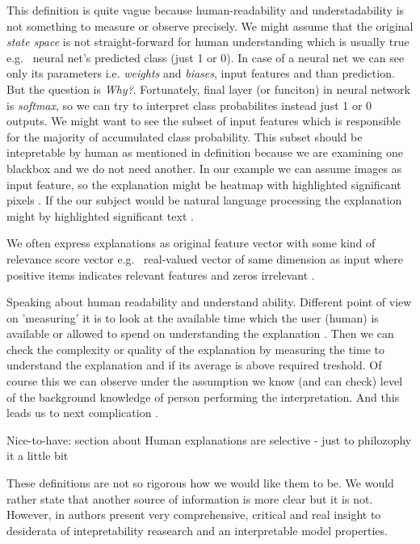 This definition is quite vague because human-readability and understadability is not something to measure or observe precisely. We might assume that the original \emph{state space} is not straight-forward for human understanding which is usually true e.g. \ neural net's predicted class (just 1 or 0). In case of a neural net we can see only its parameters i.e. \emph{weights} and \emph{biases}, input features and than prediction. But the question is \emph{Why?}. Fortunately, final layer (or funciton) in neural network is \emph{softmax}, so we can try to interpret class probabilites instead just 1 or 0 outputs. We might want to see the subset of input features which is responsible for the majority of accumulated class probability. This subset should be intepretable by human as mentioned in definition because we are examining one blackbox and we do not need another. In our example we can assume images as input feature, so the explanation might be heatmap with highlighted significant pixels \cite{Lapuschkin2015, Simonyan2014, Landecker2013}. If the our subject would be natural language processing the explanation might by highlighted significant text \cite{Arras2017, Li2016}.

We often express explanations as original feature vector with some kind of relevance score vector e.g. \ real-valued vector of same dimension as input where positive items indicates relevant features and zeros irrelevant \cite{Montavon2018}.

Speaking about human readability and understand ability. Different point of view on 'measuring' it is to look at the available time which the user (human) is available or allowed to spend on understanding the explanation \cite{Guidotti2018}. Then we can check the complexity or quality of the explanation by measuring the time to understand the explanation and if its average is above required treshold. Of course this we can observe under the assumption we know (and can check) level of the background knowledge of person performing the interpretation. And this leads us to next complication \cite{Guidotti2018}.

Nice-to-have:
\cite{Mittelstadt2019}
section about Human explanations are selective - just to philozophy it a little bit



\cite{Lipton2016}
These definitions are not so rigorous how we would like them to be. We would rather state that another source of information is more clear but it is not. However, in \cite{Lipton2016} authors present very comprehensive, critical and real insight to desiderata of intepretability reasearch and an interpretable model properties.


